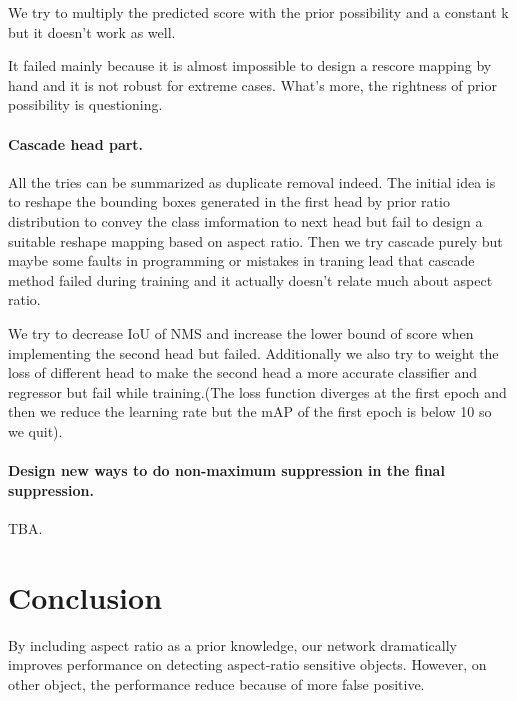 \documentclass[10pt,twocolumn,letterpaper]{article}
\begin{document}
We try to multiply the predicted score with the prior possibility and a constant k but it doesn't work as well.
 
It failed mainly because it is almost impossible to design a rescore mapping by hand and it is not robust for extreme cases. What's more, the rightness of prior possibility is questioning.

\paragraph{Cascade head part. }All the tries can be summarized as duplicate removal indeed. The initial idea is to reshape the bounding boxes generated in the first head by prior ratio distribution to convey the class imformation to next head but fail to design a suitable reshape mapping based on aspect ratio. Then we try cascade purely but maybe some faults in programming or mistakes in traning lead that cascade method failed during training and it actually doesn't relate much about aspect ratio.

We try to decrease IoU of NMS and increase the lower bound of score when implementing the second head but failed. Additionally we also try to weight the loss of different head to make the second head a more accurate classifier and regressor but fail while training.(The loss function diverges at the first epoch and then we reduce the learning rate but the mAP of the first epoch is below 10 so we quit).

\paragraph{Design new ways to do non-maximum suppression in the final suppression.} TBA.


\section{Conclusion}
By including aspect ratio as a prior knowledge, our network dramatically improves performance on detecting aspect-ratio sensitive objects. However, on other object, the performance reduce because of more false positive.

{\small


}
\end{document}
